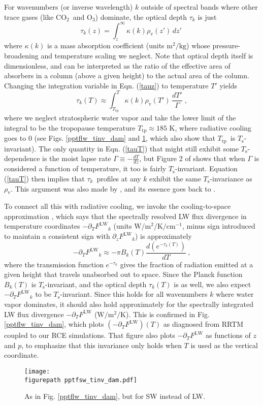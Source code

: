\documentclass[9pt,twocolumn,twoside,lineno]{pnas-new}
\newcommand{\beqn}{\begin{equation}}
\newcommand{\eeqn}{\end{equation}}
\newcommand{\eqnref}[1]{(\ref{#1})}
\newcommand{\ppz}{\ensuremath{\partial_z}}
\newcommand{\ppt}{\ensuremath{\partial_T}}
\newcommand{\cotwo}{\ensuremath{\mathrm{CO_2}}}
\newcommand{\othree}{\ensuremath{\mathrm{O_3}}}
\newcommand{\FLW}{\ensuremath{F^\mathrm{LW}}}
\newcommand{\cminverse}{\ensuremath{\mathrm{cm^{-1}}}}
\newcommand{\tauk}{\ensuremath{\tau_k}}
\newcommand{\Wmsq}{\ensuremath{\mathrm{W/m^2}}}
\newcommand{\rhov}{\ensuremath{\rho_\mathrm{v}}}
\newcommand{\Ts}{\ensuremath{T_\mathrm{s}}}
\newcommand{\Ttp}{\ensuremath{T_\mathrm{tp}}}
\newcommand{\figurepath}{../../figures/}
\begin{document}
	 
	For wavenumbers (or inverse wavelength) $k$ outside of spectral bands where other trace gases (like \cotwo\ and \othree) dominate, the optical depth $\tauk$ is just
	\beqn
		\tau_k(z) = \int_z^\infty \kappa(k)  \rhov(z') \, dz'  \; 
		\label{tauz}
	\eeqn
		where $\kappa(k)$ is a  mass absorption coefficient  (units $\mathrm{m^2/kg}$) whose pressure-broadening and temperature scaling we neglect. Note that optical depth itself is dimensionless, and can be interpreted as the ratio of the effective area of absorbers in a column (above a given height) to the actual area of the column. Changing the integration variable in Eqn. \eqnref{tauz} to temperature $T'$  yields
		\beqn
		\tau_k(T) \approx \int_{\Ttp}^T \kappa(k)  \rhov(T') \, \frac{dT'}{\Gamma}  \; ,
		\label{tauT}
	\eeqn
	where we neglect stratospheric water vapor and take the lower limit of the integral to be the tropopause temperature $\Ttp \approx 185$ K, where radiative cooling goes to 0 (see Figs. \ref{pptflw_tinv_dam} and  \ref{pptfsw_tinv_dam}, which also show that \Ttp\ is \Ts-invariant). The only quantity in Eqn. \eqnref{tauT} that might still exhibit some \Ts-dependence is the  moist lapse rate $\Gamma\equiv -\frac{dT}{dz}$, but Figure 2 of \cite{ingram2010} shows that when $\Gamma$ is considered a function of temperature, it too is fairly  \Ts-invariant. Equation \eqnref{tauT} then implies that \tauk\ profiles at any $k$ exhibit the same \Ts-invariance as \rhov. This argument was also made by \cite{ingram2010}, and its essence goes back to  \cite{simpson1928}.
	
	To connect all this with radiative cooling, we invoke the cooling-to-space  approximation \cite[][]{thomas2002, rodgers1966}, which says that the spectrally resolved LW flux divergence in temperature coordinates $-\ppt \FLW_k$ (units $\Wmsq/\mathrm{K}/\cminverse$, minus sign introduced to maintain a consistent sign with  $\ppz \FLW_k$) is approximately
	\beqn
		-\ppt \FLW_k \approx - \pi B_k(T) \frac{d (e^{-\tauk(T)})}{dT} \ ,
	\label{cts_spectral}
	\eeqn
where  the transmission function $e^{-\tauk}$ gives the fraction of radiation emitted at a given height that travels unabsorbed out to space. Since the Planck function $B_k(T)$ is \Ts-invariant, and the optical depth $\tauk(T)$ is as well, we also expect $-\ppt \FLW_k$ to be \Ts-invariant. Since this holds for all wavenumbers $k$ where water vapor dominates, it should also hold approximately for the spectrally integrated LW flux divergence $-\ppt \FLW$ ($\Wmsq/\mathrm{K}$). This is confirmed in  Fig.  \ref{pptflw_tinv_dam}, which plots $(-\ppt \FLW)(T)$ as diagnosed from RRTM coupled to our  RCE simulations.  That figure also plots $-\ppt \FLW$ as functions of $z$ and $p$, to emphasize that this invariance only holds  when $T$ is used as the vertical coordinate.
\begin{figure}[t]
	\begin{center}
			\texttt{[image: \\figurepath pptfsw\_tinv\_dam.pdf]}
		\caption{As in Fig. \ref{pptflw_tinv_dam}, but for SW instead of LW.
		\label{pptfsw_tinv_dam}
		}
	\end{center}
\end{figure}
\end{document}
